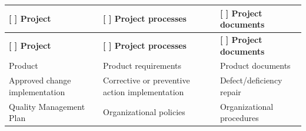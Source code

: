 \documentclass[10pt,letterpaper]{article}
\renewcommand\arraystretch{1.25}
\begin{document}
\begin{center}
\begingroup
\setlength\tabcolsep{2.0pt}
\footnotesize
\renewcommand\arraystretch{1.55}
\begin{longtable}{|>{\raggedright\arraybackslash}p{2.120in}|>{\raggedright\arraybackslash}p{2.120in}|>{\raggedright\arraybackslash}p{2.120in}|}
\hline
\rowcolor{light}
\textbf{[ ] Project} & \textbf{[ ] Project processes} & \textbf{[ ] Project documents} \\ \hline
\endfirsthead
\hline\rowcolor{light} \textbf{[ ] Project} & \textbf{[ ] Project processes} & \textbf{[ ] Project documents} \\ \hline
\endhead
[ ] Product & [ ] Product requirements & [ ] Product documents \\ \hline
[ ] Approved change implementation & [ ] Corrective or preventive action implementation & [ ] Defect/deficiency repair \\ \hline
[ ] Quality Management Plan & [ ] Organizational policies & [ ] Organizational procedures \\ \hline
\end{longtable}
\endgroup
\end{center}
\end{document}
